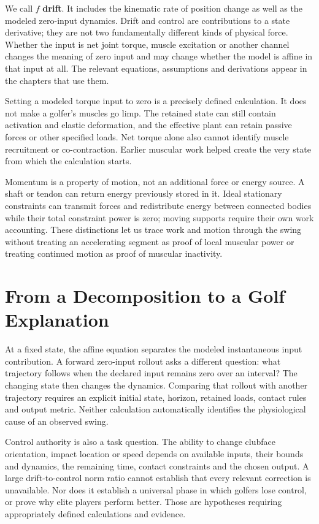 \documentclass[10pt,letterpaper,openany]{book}
\theoremstyle{plain}
\begin{document}
We call \(f\) \textbf{drift}. It includes the kinematic rate of position change as well as the modeled zero-input dynamics. Drift and control are contributions to a state derivative; they are not two fundamentally different kinds of physical force. Whether the input is net joint torque, muscle excitation or another channel changes the meaning of zero input and may change whether the model is affine in that input at all. The relevant equations, assumptions and derivations appear in the chapters that use them.

Setting a modeled torque input to zero is a precisely defined calculation. It does not make a golfer's muscles go limp. The retained state can still contain activation and elastic deformation, and the effective plant can retain passive forces or other specified loads. Net torque alone also cannot identify muscle recruitment or co-contraction. Earlier muscular work helped create the very state from which the calculation starts.

Momentum is a property of motion, not an additional force or energy source. A shaft or tendon can return energy previously stored in it. Ideal stationary constraints can transmit forces and redistribute energy between connected bodies while their total constraint power is zero; moving supports require their own work accounting. These distinctions let us trace work and motion through the swing without treating an accelerating segment as proof of local muscular power or treating continued motion as proof of muscular inactivity.

\section*{From a Decomposition to a Golf Explanation}\label{from-a-decomposition-to-a-golf-explanation}

At a fixed state, the affine equation separates the modeled instantaneous input contribution. A forward zero-input rollout asks a different question: what trajectory follows when the declared input remains zero over an interval? The changing state then changes the dynamics. Comparing that rollout with another trajectory requires an explicit initial state, horizon, retained loads, contact rules and output metric. Neither calculation automatically identifies the physiological cause of an observed swing.

Control authority is also a task question. The ability to change clubface orientation, impact location or speed depends on available inputs, their bounds and dynamics, the remaining time, contact constraints and the chosen output. A large drift-to-control norm ratio cannot establish that every relevant correction is unavailable. Nor does it establish a universal phase in which golfers lose control, or prove why elite players perform better. Those are hypotheses requiring appropriately defined calculations and evidence.
\end{document}
